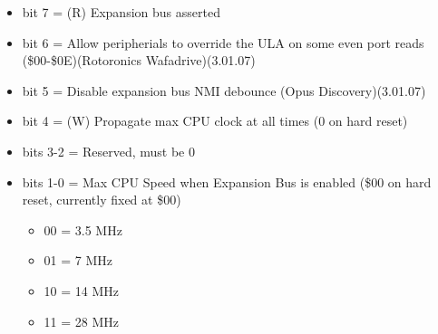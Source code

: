 \begin{itemize}
\item bit 7 = (R) Expansion bus  asserted
\item bit 6 = Allow peripherials to override the ULA on some even
  port reads (\$00-\$0E)(Rotoronics Wafadrive)(3.01.07)
\item bit 5 = Disable expansion bus NMI debounce (Opus Discovery)(3.01.07)
\item bit 4 = (W) Propagate max CPU clock at all times (0 on hard
  reset)
\item bits 3-2 = Reserved, must be 0
\item bits 1-0 = Max CPU Speed when Expansion Bus is enabled (\$00 on
  hard reset, currently fixed at \$00)
  \begin{itemize}
  \item 00 = 3.5 MHz
  \item 01 = 7 MHz
  \item 10 = 14 MHz
  \item 11 = 28 MHz
  \end{itemize}
\end{itemize}

